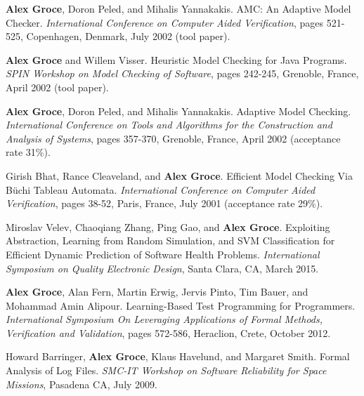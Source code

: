 \documentclass[ComputerScience]{vita}
\begin{document}
\begin{vita}
\begin{Refereed Conference and Workshop Publications}
\item
{\bf Alex Groce}, Doron Peled, and Mihalis Yannakakis.
\newblock AMC: An Adaptive Model Checker.
\newblock \emph{International Conference on Computer Aided Verification}, pages 521-525, Copenhagen, Denmark, July 2002 (tool paper).

\item
{\bf Alex Groce} and Willem Visser.
\newblock Heuristic Model Checking for Java Programs.
\newblock \emph{SPIN Workshop on Model Checking of Software}, pages 242-245, Grenoble, France, April 2002 (tool paper).

\item
{\bf Alex Groce}, Doron Peled, and Mihalis Yannakakis.
\newblock Adaptive Model Checking.
\newblock \emph{International Conference on Tools and Algorithms for the Construction and Analysis of Systems}, pages 357-370, Grenoble, France, April 2002 (acceptance rate 31\%).

\item
Girish Bhat, Rance Cleaveland, and {\bf Alex Groce}.
\newblock Efficient Model Checking Via B\"uchi Tableau Automata.
\newblock \emph{International Conference on Computer Aided Verification}, pages 38-52, Paris, France, July 2001 (acceptance rate 29\%).
\end{Refereed Conference and Workshop Publications}















\begin{Invited Papers}
\item Miroslav Velev, Chaoqiang Zhang, Ping Gao, and {\bf Alex Groce}.
\newblock Exploiting Abstraction, Learning from Random Simulation, and SVM Classification for Efficient Dynamic Prediction of Software Health Problems.
\newblock \emph{International Symposium on Quality Electronic Design}, Santa Clara, CA, March 2015.

\item {\bf Alex Groce}, Alan Fern, Martin Erwig, Jervis Pinto, Tim Bauer, and Mohammad Amin Alipour.
\newblock Learning-Based Test Programming for Programmers.
\newblock \emph{International Symposium On Leveraging Applications of Formal Methods, Verification and Validation}, pages 572-586, Heraclion, Crete, October 2012.


\item Howard Barringer, {\bf Alex Groce}, Klaus Havelund, and Margaret Smith.
\newblock Formal Analysis of Log Files.
\newblock \emph{SMC-IT Workshop on Software Reliability for Space Missions}, Pasadena CA, July 2009.



\end{Invited Papers}
\end{vita}
\end{document}
